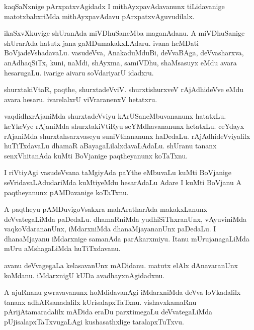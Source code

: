 \documentclass{article}
\begin{document}
\begin{mn}%
kaqSaNxnige pArxpatxvAgidadx I mithAyxpavAdavanunx tiLidavanige
matotxbabxriMda mithAyxpavAdavu pArxpatxvAguvudilalx.
\end{mn}

\begin{mn}%
ikaSxvXkuvige shUranAda miVDhuSaneMba maganAdanu. A miVDhuSanige
shUrarAda hatutx jana gaMDumakakxLAdaru. ivana heMDati
BoVjadeVshadavaLu. vasudeVva, AnakaduMduBi, deVvaBAga, deVvasharxva,
anAdhaqSiTx, kuni, naMdi, shAyxma, samiVDhu, shaMsasuyx eMdu avara
hesarugaLu. ivarige aivaru soVdariyarU idadxru.
\end{mn}

\begin{mn}%
shurxtakiVtaR, paqthe, shurxtadeVviV. shurxtishurxveV rAjAdhideVve
eMdu avara hesaru. ivarelalxrU viVraranenxV hetatxru.
\end{mn}

\begin{mn}%
vaqdidhxrAjaniMda shurxtadeVviyu kArUSaneMbuvananunx
hatatxLu. keYkeVye rAjaniMda shurxtakiVtiRyu seYMdhavananunx
hetatxLu. ceYdayx rAjaniMda shurxtahsarxvaseyu suniVthananunx
haDedaLu. rAjAdhideVviyalilx huTiTxdavaLu dhamaR
aBayagaLilalxdavaLAdaLu. shUranu tananx senxVhitanAda kuMti BoVjanige
paqtheyanunx koTaTxnu.
\end{mn}

\begin{mn}%
I riVtiyAgi vasudeVvana taMgiyAda paYthe eMbuvaLu kuMti BoVjanige
seVridavaLAdudariMda kuMtiyeMdu hesarAdaLu Adare I kuMti BoVjanu A
paqtheyanunx pAMDavanige koTaTxnu.
\end{mn}

\begin{mn}%
A paqtheyu pAMDuvigoVsakxra mahAratharAda makakxLanunx deVvategaLiMda
paDedaLu. dhamaRniMda yudhiSiThxranUnx, vAyuviniMda vaqkoVdarananUnx,
iMdarxniMda dhanaMjayananUnx paDedaLu. I dhanaMjayanu iMdarxnige
samanAda parAkarxmiyu. Itanu mUrujanagaLiMda mUru aMshagaLiMda huTiTxdavanu.
\end{mn}

\begin{mn}
avanu deVvagegaLa kelasavanUnx mADidanu. matutx elAlx dAnavaranUnx
koMdanu. iMdarxnigU kUDa avadhayxnAgidadxnu.
\end{mn}

\begin{mn}
A ajuRnanu gwravavanunx hoMdidavanAgi iMdarxniMda deVva loVkadalilx
tananx adhARsanadalilx kUrisalapxTaTxnu. vishavxkamaRnu
pArijAtamaradalilx mADida eraDu parxtimegaLu deVvategaLiMda
pUjisalapxTaTxvugaLAgi kushasathxlige taralapxTuTxvu.
\end{mn}
\end{document}
